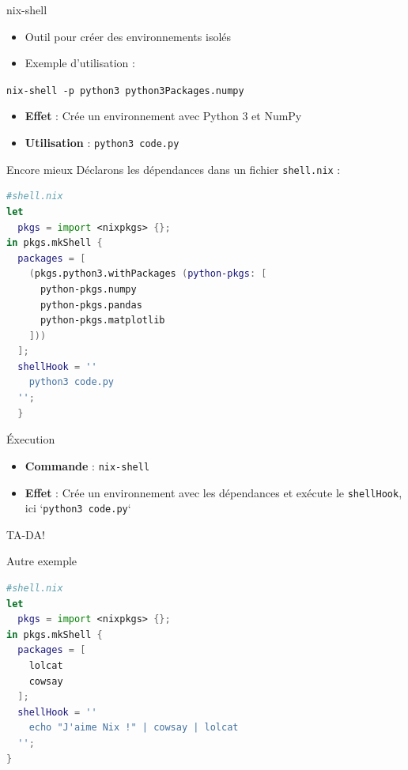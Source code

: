 \documentclass{beamer}
\begin{document}
\begin{frame}{nix-shell}
  \begin{itemize}
    \item Outil pour créer des environnements isolés
    \item Exemple d'utilisation :
  \end{itemize}
  \begin{center}
    \texttt{nix-shell -p python3 python3Packages.numpy}
  \end{center}
  \begin{itemize}
    \item \textbf{Effet} : Crée un environnement avec Python 3 et NumPy
    \item \textbf{Utilisation} : \texttt{python3 code.py}
  \end{itemize}
\end{frame}


\begin{frame}[fragile]{Encore mieux}
  Déclarons les dépendances dans un fichier \texttt{shell.nix} :
  {\small
	\begin{lstlisting}[language=nix]
#shell.nix
let
  pkgs = import <nixpkgs> {};
in pkgs.mkShell {
  packages = [
    (pkgs.python3.withPackages (python-pkgs: [
      python-pkgs.numpy
      python-pkgs.pandas
      python-pkgs.matplotlib
    ]))
  ];
  shellHook = ''
    python3 code.py
  '';
  }
\end{lstlisting}
}
\end{frame}

\begin{frame}{Éxecution}
  \begin{itemize}
    \item \textbf{Commande} : \texttt{nix-shell}
    \item \textbf{Effet} : Crée un environnement avec les dépendances et exécute
      le \texttt{shellHook}, ici `\texttt{python3 code.py}`
  \end{itemize}
  \begin{center}
    \huge{TA-DA!}
  \end{center}
\end{frame}

\begin{frame}[fragile]{Autre exemple}
	\begin{lstlisting}[language=nix]
#shell.nix
let
  pkgs = import <nixpkgs> {};
in pkgs.mkShell {
  packages = [
    lolcat
    cowsay
  ];
  shellHook = ''
    echo "J'aime Nix !" | cowsay | lolcat
  '';
}
\end{lstlisting}
\end{frame}
\end{document}

